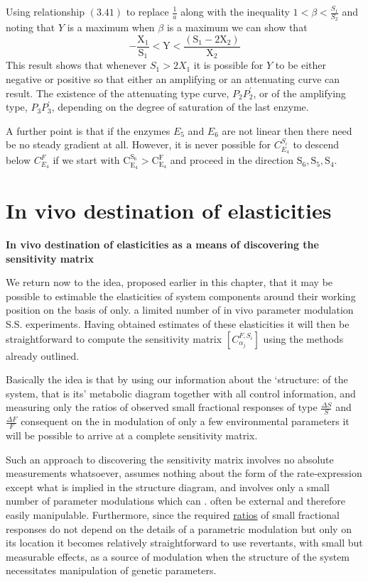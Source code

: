 Using relationship $(3.41)$ to replace $\frac{1}{a}$ along with the inequality $1 < \beta < \frac{S_{1}}{S_{2}}$ and noting that $Y$ is a maximum when $\beta$ is a maximum we can show that
%
$$
-\frac{\mathrm{X}_{1}}{\mathrm{S}_{1}} < \mathrm{Y} < \frac{\left(\mathrm{S}_{1}-2 \mathrm{X}_{2}\right)}{\mathrm{X}_{2}}
$$
%
This result shows that whenever $S_{1}>2 X_{1}$ it is possible for $Y$ to be either negative or positive so that either an amplifying or an attenuating curve can result. The existence of the attenuating type curve, $P_{2} P_{2}^{\prime}$, or of the amplifying type, $P_{3} P_{3}^{\prime}$, depending on the degree of saturation of the last enzyme.

A further point is that if the enzymes $E_{5}$ and $E_{6}$ are not linear then there need be no steady gradient at all. However, it is never possible for $C_{E_4}^{S_i}$ to descend below $C_{E_4}^{F}$ if we start with $\mathrm{C}_{\mathrm{E_4}}^{\mathrm{S}_{6}} > \mathrm{C}_{\mathrm{E}_{4}}^{\mathrm{F}}$ and proceed in the direction $\mathrm{S}_{6}, \mathrm{S}_{5}, \mathrm{S}_{4}$.


\section{In vivo destination of elasticities}

{\bf In vivo destination of elasticities as a means of discovering the sensitivity matrix}

We return now to the idea, proposed earlier in this chapter, that it may be possible to estimable the elasticities of system components around their working position on the basis of only. a limited number of in vivo parameter modulation S.S. experiments. Having obtained estimates of these elasticities it will then be straightforward to compute the sensitivity matrix $\left[C_{\alpha_{j}}^{F, S_{i}}\right]$ using the methods already outlined.

Basically the idea is that by using our information about the `structure: of the system, that is its' metabolic diagram together with all control information, and measuring only the ratios of observed small fractional responses of type $\frac{\Delta S}{S}$ and $\frac{\Delta F}{F}$ consequent on the in modulation of only a few environmental parameters it will be possible to arrive at a complete sensitivity matrix.

Such an approach to discovering the sensitivity matrix involves no absolute measurements whatsoever, assumes nothing about the form of the rate-expression except what is implied in the structure diagram, and involves only a small number of parameter modulations which can . often be external and therefore easily manipulable. Furthermore, since the required \underline{ratios} of small fractional responses do not depend on the details of a parametric modulation but only on its location it becomes relatively straightforward to use revertants, with small but measurable effects, as a source of modulation when the structure of the system necessitates manipulation of genetic parameters.

